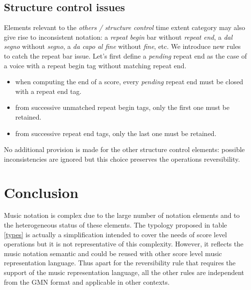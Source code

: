\documentclass[twoside,10pt,a4paper]{article}
\begin{document}
\subsection{Structure control issues} \label{sc}
Elements relevant to the \emph{others / structure control} time extent category may also give rise to inconsistent notation: a \emph{repeat begin} bar without \emph{repeat end}, a \emph{dal segno} without \emph{segno}, a \emph{da capo al fine} without \emph{fine}, etc. We introduce new rules to catch the repeat bar issue. Let's first define a \emph{pending} repeat end as the case of a voice with a repeat begin tag without matching repeat end.
\begin{itemize}
\item when computing the end of a score, every \emph{pending} repeat end must be closed with a repeat end tag.
\item from successive unmatched repeat begin tags, only the first one must be retained.
\item from successive repeat end tags, only the last one must be retained.
\end{itemize}
No additional provision is made for the other structure control elements: possible inconsistencies are ignored but this choice preserves the operations reversibility.

\section{Conclusion}
Music notation is complex due to the large number of notation elements and to the heterogeneous status of these elements. The typology proposed in table \ref{types} is actually a simplification intended to cover the needs of score level operations but it is not representative of this complexity. However, it reflects the music notation semantic and could be reused with other score level music representation language. Thus apart for the reversibility rule that requires the support of the music representation language, all the other rules are independent from the GMN format and applicable in other contexts.


\end{document}
